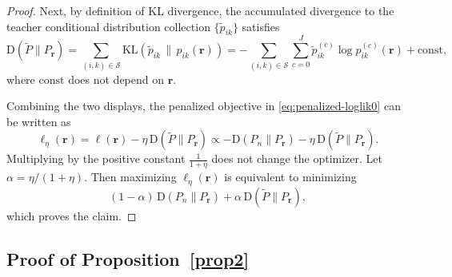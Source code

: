 \documentclass{article}
\theoremstyle{plain}
\theoremstyle{definition}
\theoremstyle{remark}
\begin{document}
\begin{proof}
Next, by definition of KL divergence, the accumulated divergence to the teacher conditional
distribution collection $\{\tilde p_{ik}\}$ satisfies
\[
\mathrm{D}(\tilde P\parallel P_{\bm r})
=
\sum_{(i,k)\in\mathcal S}\mathrm{KL}\!\left(\tilde p_{ik}\,\|\,p_{ik}(\bm r)\right)
=
-\sum_{(i,k)\in\mathcal S}\sum_{c=0}^J \tilde p_{ik}^{(c)}\log p_{ik}^{(c)}(\bm r)
+\mathrm{const},
\]
where $\mathrm{const}$ does not depend on $\bm r$.

Combining the two displays, the penalized objective in \eqref{eq:penalized-loglik0} can be written as
\[
\ell_\eta(\bm r)
=
\ell(\bm r)-\eta\,\mathrm{D}(\tilde P\parallel P_{\bm r})
\propto
-\mathrm{D}(P_n\parallel P_{\bm r})
-\eta\,\mathrm{D}(\tilde P\parallel P_{\bm r}).
\]
Multiplying by the positive constant $\frac{1}{1+\eta}$ does not change the optimizer. Let
$\alpha=\eta/(1+\eta)$. Then maximizing $\ell_\eta(\bm r)$ is equivalent to minimizing
\[
(1-\alpha)\,\mathrm{D}(P_n\parallel P_{\bm r})
+\alpha\,\mathrm{D}(\tilde P\parallel P_{\bm r}),
\]
which proves the claim.
\end{proof}



\subsection{Proof of Proposition~\ref{prop2}}
\label{app:proof-prop2}
\end{document}
